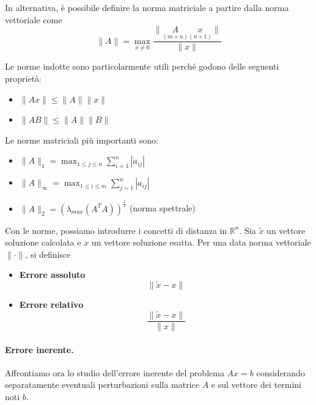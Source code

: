 \documentclass{article}
\begin{document}
\begin{definition}
    In alternativa, è possibile definire la norma matriciale a partire dalla norma
    vettoriale come
    $$\lVert A\rVert=\max_{x\neq0}\frac{\lVert \underset{(m\times
    n)}A\underset{(n\times 1)}x\rVert}{\lVert x\rVert}$$
\end{definition}
Le norme indotte sono particolarmente utili perché godono delle seguenti
proprietà:
\begin{itemize}
    \item $\lVert Ax\rVert\leq \lVert A\rVert \lVert x\rVert$
    \item $\lVert AB\rVert \leq \lVert A\rVert \lVert B\rVert $
\end{itemize}
Le norme matriciali più importanti sono:
\begin{itemize}
    \item $\lVert A\rVert_1=\max_{1\leq j\leq
        n}\sum_{i=1}^{n}\left\lvert a_{ij}\right\rvert$ 
    \item $\lVert A\rVert_\infty=\max_{1\leq i\leq
        m}\sum_{j=1}^{n}\left\lvert a_{ij}\right\rvert$ 
    \item $\lVert A\rVert_2=\left(\lambda_{max}(A^TA)\right)^{\frac{1}{2}}$
        (norma spettrale)
\end{itemize}

Con le norme, possiamo introdurre i concetti di distanza in $\mathbb{R}^{n}$.
Sia $\tilde{x}$ un vettore soluzione calcolata e $x$ un vettore soluzione
esatta. Per una data norma vettoriale $\lVert \cdot \rVert$, si definisce 
\begin{itemize}
    \item \textbf{Errore assoluto}
        $$\lVert \tilde{x}-x\rVert$$
    \item \textbf{Errore relativo}
        $$\frac{\lVert \tilde{x}-x\rVert}{\lVert x\rVert}$$
\end{itemize}
\paragraph{Errore inerente.} Affrontiamo ora lo studio dell'errore inerente
del problema $Ax=b$ considerando separatamente eventuali perturbazioni sulla
matrice $A$ e sul vettore dei termini noti $b$.
\end{document}
